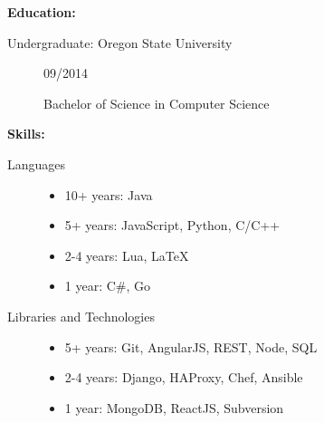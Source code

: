 \documentclass[11pt]{article}
\begin{document}
\smallskip
{\huge \textbf{Education:}}
\hrulefill
\smallskip
\begin{description}
\item[Undergraduate: Oregon State University]
\hfill 09/2014

Bachelor of Science in Computer Science
\end{description}
\bigskip
{\huge \textbf{Skills:}}
\hrulefill
\smallskip
\begin{description}
\item[Languages]
\hfill
\begin{itemize}
\item 10+ years: Java
\item 5+ years: JavaScript, Python, C/C++
\item 2-4 years: Lua, LaTeX
\item 1 year: C\#, Go
\end{itemize}
\item[Libraries and Technologies]
\hfill
\begin{itemize}
\item 5+ years: Git, AngularJS, REST, Node, SQL
\item 2-4 years: Django, HAProxy, Chef, Ansible
\item 1 year: MongoDB, ReactJS, Subversion
\end{itemize}
\end{description}
\end{document}
